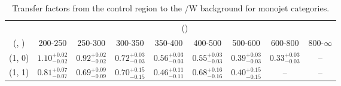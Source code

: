 \begin{table}[h!]
\tiny
\centering
\caption{Transfer factors from the \mj control region to the \ttbar/W background for monojet categories.\label{tab:tf_mu_ttw_mono}}
\begin{tabular}
{ccccccccc}
	\hline\hline
	& \multicolumn{8}{c}{\scalht (\gev)} \\ 
	 (\njet,  \nb) & 200-250 & 250-300 & 300-350 & 350-400 & 400-500 & 500-600 & 600-800 & 800-$\infty$ \\ [0.8ex] 
\hline
	(1, 0) & $1.10^{+ 0.02 }_{- 0.02 }$ & $0.92^{+ 0.02 }_{- 0.02 }$ & $0.72^{+ 0.03 }_{- 0.03 }$ & $0.56^{+ 0.03 }_{- 0.03 }$ & $0.55^{+ 0.03 }_{- 0.03 }$ & $0.39^{+ 0.03 }_{- 0.03 }$ & $0.33^{+ 0.03 }_{- 0.03 }$ & -- \\[0.5ex] 
	(1, 1) & $0.81^{+ 0.07 }_{- 0.07 }$ & $0.69^{+ 0.09 }_{- 0.09 }$ & $0.70^{+ 0.15 }_{- 0.15 }$ & $0.46^{+ 0.11 }_{- 0.11 }$ & $0.68^{+ 0.16 }_{- 0.16 }$ & $0.40^{+ 0.15 }_{- 0.15 }$ & -- & -- \\[0.5ex] 
	\hline
	\hline
\end{tabular}
\end{table}
